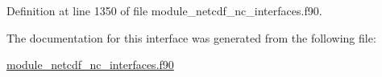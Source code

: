 Definition at line 1350 of file module\+\_\+netcdf\+\_\+nc\+\_\+interfaces.\+f90.



The documentation for this interface was generated from the following file\+:\begin{DoxyCompactItemize}
\item 
\hyperlink{module__netcdf__nc__interfaces_8f90}{module\+\_\+netcdf\+\_\+nc\+\_\+interfaces.\+f90}\end{DoxyCompactItemize}
